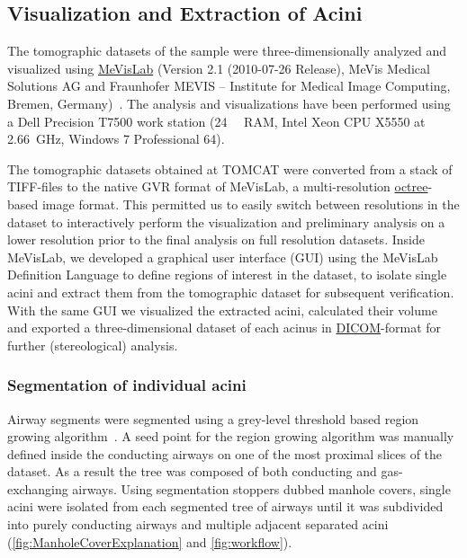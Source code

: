 \documentclass[a4paper,DIV=calc,abstract,english]{scrartcl}
\begin{document}
\subsection{Visualization and Extraction of Acini}
The tomographic datasets of the sample were three-dimensionally analyzed and visualized using \href{http://mevislab.de}{MeVisLab} (Version 2.1 (2010-07-26 Release), MeVis Medical Solutions AG and Fraunhofer MEVIS -- Institute for Medical Image Computing, Bremen, Germany)~\cite{Bitter2007}.
The analysis and visualizations have been performed using a Dell Precision T7500 work station (\SI{24}{\giga\byte} RAM, Intel Xeon CPU X5550 at \SI{2.66}{\giga\hertz}, Windows 7 Professional \SI{64}{\bit}).

The tomographic datasets obtained at TOMCAT were converted from a stack of TIFF-files to the native GVR format of MeVisLab, a multi-resolution \href{https://secure.wikimedia.org/wikipedia/en/w/index.php?title=Octree&oldid=409131920}{octree}-based image format.
This permitted us to easily switch between resolutions in the dataset to interactively perform the visualization and preliminary analysis on a lower resolution prior to the final analysis on full resolution datasets.
Inside MeVisLab, we developed a graphical user interface (GUI) using the MeVisLab Definition Language to define regions of interest in the dataset, to isolate single acini and extract them from the tomographic dataset for subsequent verification.
With the same GUI we visualized the extracted acini, calculated their volume and exported a three-dimensional dataset of each acinus in \href{http://en.wikipedia.org/w/index.php?title=DICOM&oldid=511155074}{DICOM}-format for further (stereological) analysis.

\subsubsection{Segmentation of individual acini}
\label{sec:manhole covers}
Airway segments were segmented using a grey-level threshold based region growing algorithm~\cite{Zucker1976}.
A seed point for the region growing algorithm was manually defined inside the conducting airways on one of the most proximal slices of the dataset.
As a result the tree was composed of both conducting and gas-exchanging airways.
Using segmentation stoppers dubbed manhole covers, single acini were isolated from each segmented tree of airways until it was subdivided into purely conducting airways and multiple adjacent separated acini (\autoref{fig:ManholeCoverExplanation} and \ref{fig:workflow}).
\end{document}
